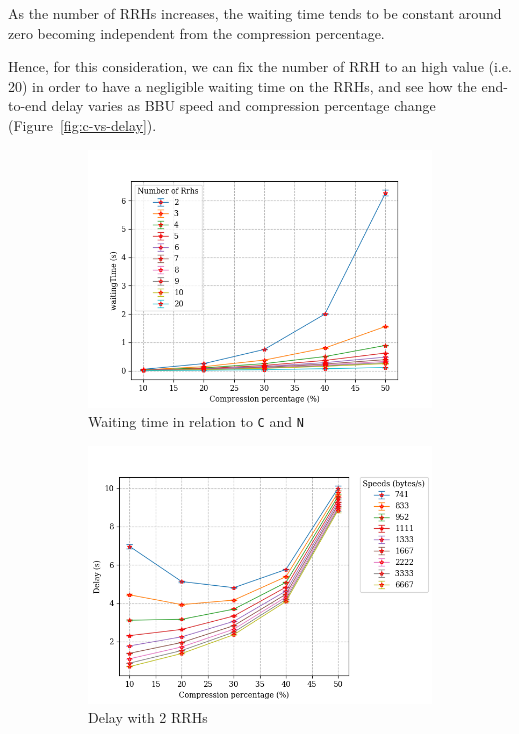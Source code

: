 \documentclass[11pt,a4paper,oneside, openright]{article}
\begin{document}
As the number of RRHs increases, the waiting time tends to be constant around zero becoming independent from the compression percentage.

Hence, for this consideration, we can fix the number of RRH to an high value (i.e. 20) in order to have a negligible waiting time on the RRHs, and see how the end-to-end delay varies as BBU speed and compression percentage change (Figure~\ref{fig:c-vs-delay}).

\begin{figure}[b]
\centering
\begin{subfigure}{.5\textwidth}
  \centering
  \includegraphics[width=\linewidth]{images/c-vs-waiting-from-2}
  \caption{Waiting time in relation to \texttt{C} and \texttt{N}}
  \label{fig:c-vs-waiting-2}
\end{subfigure}%
\begin{subfigure}{.5\textwidth}
  \centering
  \includegraphics[width=\linewidth]{images/worst-case}
  \caption{Delay with 2 RRHs}
  \label{fig:worst-case}
\end{subfigure}
\caption{}
\label{fig:waiting-and-delay-2}
\end{figure}
\end{document}
